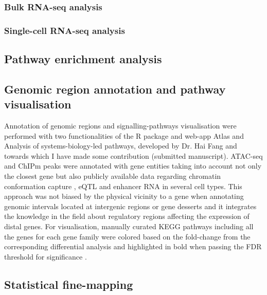 	\subsubsection{Bulk RNA-seq analysis}

	\subsubsection{Single-cell RNA-seq analysis}

\subsection{Pathway enrichment analysis}


\subsection{Genomic region annotation and pathway visualisation}
Annotation of genomic regions and signalling-pathways visualisation were performed with two functionalities of the R package and web-app Atlas and Analysis of systems-biology-led pathways, developed by Dr. Hai Fang and towards which I have made some contribution (submitted manuscript)\parencite{}. ATAC-seq and ChIPm peaks were annotated with gene entities taking into account not only the closest gene but also publicly available data regarding chromatin conformation capture \parencite{}, eQTL \parencite{} and enhancer RNA \parencite{} in several cell types. This approach was not biased by the physical vicinity to a gene when annotating genomic intervals located at intergenic regions or gene desserts and it integrates the knowledge in the field about regulatory regions affecting the expression of distal genes. For visualisation, manually curated KEGG pathways including all the genes for each gene family were colored based on the fold-change from the corresponding differential analysis and highlighted in bold when passing the FDR threshold for significance .


\subsection{Statistical fine-mapping}

